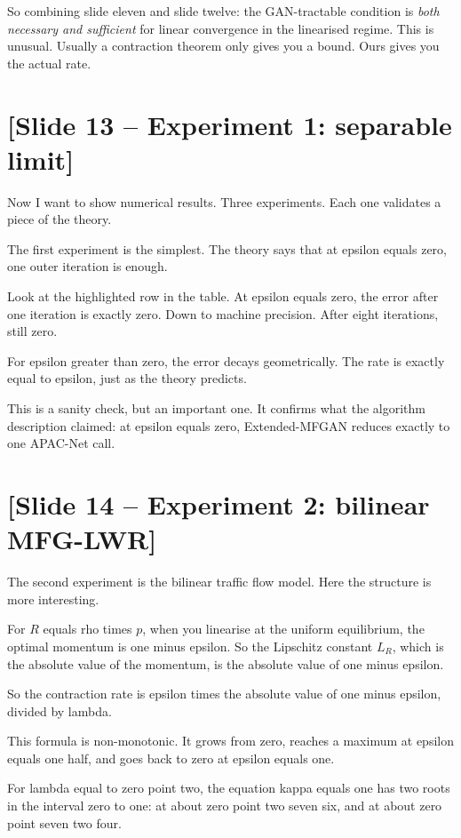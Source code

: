 \documentclass[11pt]{article}
\begin{document}
So combining slide eleven and slide twelve: the GAN-tractable condition
is \emph{both necessary and sufficient} for linear convergence in the
linearised regime. This is unusual. Usually a contraction theorem only gives
you a bound. Ours gives you the actual rate.

\section*{[Slide 13 -- Experiment 1: separable limit]}

Now I want to show numerical results. Three experiments. Each one validates
a piece of the theory.

The first experiment is the simplest. The theory says that at epsilon equals
zero, one outer iteration is enough.

Look at the highlighted row in the table. At epsilon equals zero, the error
after one iteration is exactly zero. Down to machine precision. After eight
iterations, still zero.

For epsilon greater than zero, the error decays geometrically. The rate is
exactly equal to epsilon, just as the theory predicts.

This is a sanity check, but an important one. It confirms what the algorithm
description claimed: at epsilon equals zero, Extended-MFGAN reduces exactly
to one APAC-Net call.

\section*{[Slide 14 -- Experiment 2: bilinear MFG-LWR]}

The second experiment is the bilinear traffic flow model. Here the structure
is more interesting.

For $R$ equals rho times $p$, when you linearise at the uniform equilibrium,
the optimal momentum is one minus epsilon. So the Lipschitz constant $L_R$,
which is the absolute value of the momentum, is the absolute value of one
minus epsilon.

So the contraction rate is epsilon times the absolute value of one minus
epsilon, divided by lambda.

This formula is non-monotonic. It grows from zero, reaches a maximum at
epsilon equals one half, and goes back to zero at epsilon equals one.

For lambda equal to zero point two, the equation kappa equals one has two
roots in the interval zero to one: at about zero point two seven six, and
at about zero point seven two four.
\end{document}
